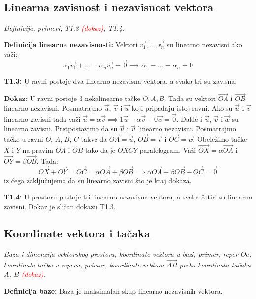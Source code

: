 \documentclass[12pt]{article}
\newcommand{\vek}[1]{\overrightarrow{#1}}
\newcommand{\ocena}[1]{\textcolor{red}{#1}}
\begin{document}
\subsection{Linearna zavisnost i nezavisnost vektora}
\textit{Definicija, primeri, T1.3 \ocena{(dokaz)}, T1.4.}
\par
\vspace*{1cm}

\textbf{Definicija linearne nezavisnosti:} Vektori $\vek{v_1},\dotsc,\vek{v_n}$
su linearno nezavisni ako važi:
$$\alpha_1\vek{v_1}+\dotsc+\alpha_n\vek{v_n}=\vek{0} \implies \alpha_1=
    \dotsc=\alpha_n=0$$
\par

\textbf{T1.3:}\label{theorem:1.3} U ravni postoje dva linearno nezavisna
vektora, a svaka tri su zavisna.
\par
\textbf{Dokaz:} U ravni postoje 3 nekolinearne tačke $O, A, B$. Tada su vektori
$\vek{OA}$ i $\vek{OB}$ linearno nezavisni. Posmatrajmo $\vek{u}$, $\vek{v}$ i
$\vek{w}$ koji pripadaju istoj ravni. Ako su $\vek{u}$ i $\vek{v}$ linearno
zavisni tada važi $\vek{u}=\alpha\vek{v}\implies 1\vek{u}-\alpha\vek{v}+
    0\vek{w}=\vek{0}$. Dakle i $\vek{u}$, $\vek{v}$ i $\vek{w}$ su linearno
zavisni. Pretpostavimo da su $\vek{u}$ i $\vek{v}$ linearno nezavisni.
Posmatrajmo tačke u ravni $O$, $A$, $B$, $C$ takve da $\vek{OA}=\vek{u}$,
$\vek{OB}=\vek{v}$ i $\vek{OC}=\vek{w}$. Obeležimo tačke $X$ i $Y$ na pravim
$OA$ i $OB$ tako da je $OXCY$ paralelogram. Važi $\vek{OX}=\alpha\vek{OA}$ i
$\vek{OY}=\beta\vek{OB}$. Tada:
$$\vek{OX}+\vek{OY}=\vek{OC}=\alpha\vek{OA}+\beta\vek{OB} \implies
    \alpha\vek{OA}+\beta\vek{OB}-\vek{OC}=\vek{0}$$
iz čega zaključujemo da su linearno zavisni što je kraj dokaza.
\par

\textbf{T1.4:} U prostoru postoje tri linearno nezavisna vektora, a svaka
četiri su linearno zavisni. Dokaz je sličan dokazu
\hyperref[theorem:1.3]{T1.3}.


\subsection{Koordinate vektora i tačaka}
\textit{Baza i dimenzija vektorskog prostora, koordinate vektora u bazi,
    primer, reper $Oe$, koordinate tačke u reperu, primer, koordinate vektora
    $\vek{AB}$ preko koordinata tačaka $A$, $B$ \ocena{(dokaz)}.}
\par
\vspace*{1cm}

\textbf{Definicija baze:} Baza je maksimalan skup linearno nezavisnih vektora.
\par
\end{document}
